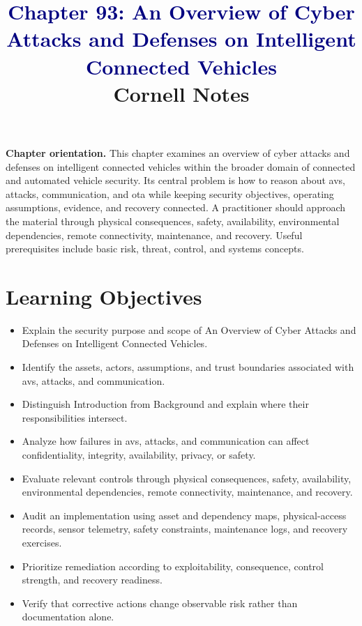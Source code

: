 \documentclass[11pt]{article}
\title{\textcolor{Navy}{Chapter 93: An Overview of Cyber Attacks and Defenses on Intelligent Connected Vehicles}\\[2mm]\large Cornell Notes}
\author{}
\date{}
\begin{document}
\maketitle
\thispagestyle{fancy}
\vspace{-1.5em}
\begin{orientationbox}
\textbf{Chapter orientation.} This chapter examines an overview of cyber attacks and defenses on intelligent connected vehicles within the broader domain of connected and automated vehicle security. Its central problem is how to reason about avs, attacks, communication, and ota while keeping security objectives, operating assumptions, evidence, and recovery connected. A practitioner should approach the material through physical consequences, safety, availability, environmental dependencies, remote connectivity, maintenance, and recovery. Useful prerequisites include basic risk, threat, control, and systems concepts.
\end{orientationbox}
\section*{Learning Objectives}
\begin{itemize}
\item Explain the security purpose and scope of An Overview of Cyber Attacks and Defenses on Intelligent Connected Vehicles.
\item Identify the assets, actors, assumptions, and trust boundaries associated with avs, attacks, and communication.
\item Distinguish Introduction from Background and explain where their responsibilities intersect.
\item Analyze how failures in avs, attacks, and communication can affect confidentiality, integrity, availability, privacy, or safety.
\item Evaluate relevant controls through physical consequences, safety, availability, environmental dependencies, remote connectivity, maintenance, and recovery.
\item Audit an implementation using asset and dependency maps, physical-access records, sensor telemetry, safety constraints, maintenance logs, and recovery exercises.
\item Prioritize remediation according to exploitability, consequence, control strength, and recovery readiness.
\item Verify that corrective actions change observable risk rather than documentation alone.
\end{itemize}
\end{document}
